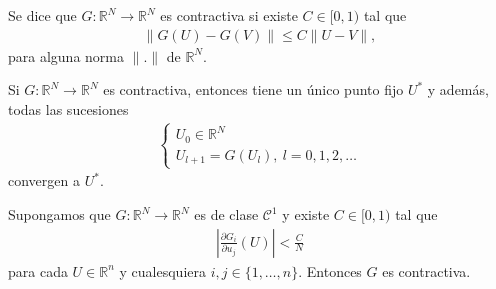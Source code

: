 \begin{defi}
    Se dice que $G: \mathbb{R}^N \longrightarrow \mathbb{R}^N$ es contractiva si existe $C \in [0,1)$ tal que
    \begin{align*}
        \| G(U) - G(V) \| \leq C \| U - V \| ,
    \end{align*}
    para alguna norma $\|.\|$ de $\mathbb{R}^N$.
\end{defi}

\begin{teo}
    Si $G: \mathbb{R}^N \longrightarrow \mathbb{R}^N$ es contractiva, entonces tiene un único punto fijo $U^*$ y además, todas las sucesiones
    \begin{align*}
        \left\{ \begin{array}{lcc}
                    U_0 \in \mathbb{R}^N \\
                    U_{l+1} = G(U_l), \ l = 0,1,2,\ldots
                \end{array}
        \right.
    \end{align*}
    convergen a $U^*$.
\end{teo}

\begin{teo}
    Supongamos que $G: \mathbb{R}^N \longrightarrow \mathbb{R}^N$ es de clase $\mathcal{C}^1$ y existe $C \in [0,1)$ tal que
    \begin{align*}
        \left| \frac{\partial G_i}{\partial u_j}(U) \right| < \frac{C}{N}
    \end{align*}
    para cada $U \in \mathbb{R}^n$ y cualesquiera $i,j \in \{1,\ldots,n\}$. Entonces $G$ es contractiva.
\end{teo}

